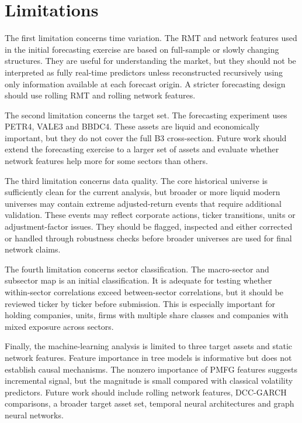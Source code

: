 \section{Limitations}
\label{sec:limitations}

The first limitation concerns time variation. The RMT and network features used in the initial forecasting exercise are based on full-sample or slowly changing structures. They are useful for understanding the market, but they should not be interpreted as fully real-time predictors unless reconstructed recursively using only information available at each forecast origin. A stricter forecasting design should use rolling RMT and rolling network features.

The second limitation concerns the target set. The forecasting experiment uses PETR4, VALE3 and BBDC4. These assets are liquid and economically important, but they do not cover the full B3 cross-section. Future work should extend the forecasting exercise to a larger set of assets and evaluate whether network features help more for some sectors than others.

The third limitation concerns data quality. The core historical universe is sufficiently clean for the current analysis, but broader or more liquid modern universes may contain extreme adjusted-return events that require additional validation. These events may reflect corporate actions, ticker transitions, units or adjustment-factor issues. They should be flagged, inspected and either corrected or handled through robustness checks before broader universes are used for final network claims.

The fourth limitation concerns sector classification. The macro-sector and subsector map is an initial classification. It is adequate for testing whether within-sector correlations exceed between-sector correlations, but it should be reviewed ticker by ticker before submission. This is especially important for holding companies, units, firms with multiple share classes and companies with mixed exposure across sectors.

Finally, the machine-learning analysis is limited to three target assets and static network features. Feature importance in tree models is informative but does not establish causal mechanisms. The nonzero importance of PMFG features suggests incremental signal, but the magnitude is small compared with classical volatility predictors. Future work should include rolling network features, DCC-GARCH comparisons, a broader target asset set, temporal neural architectures and graph neural networks.
